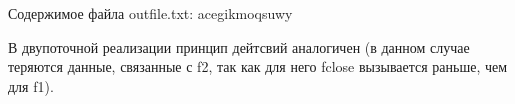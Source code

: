 \documentclass[12pt]{report}
\begin{document}
Содержимое файла outfile.txt: acegikmoqsuwy

В двупоточной реализации принцип дейтсвий аналогичен (в данном случае теряются данные, связанные с f2, так как для него fclose вызывается раньше, чем для f1).








	
\end{document}
